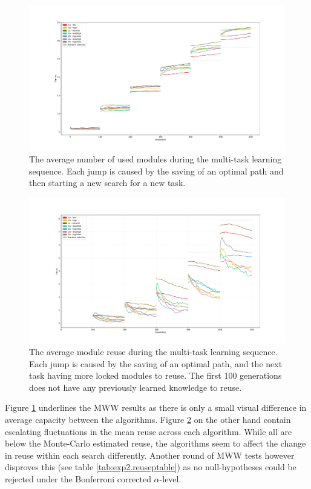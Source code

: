 \begin{figure}
    \includegraphics[width=1.2\textwidth,center]{Chapters/4.Experiments/exp2/figures/large/Capacity_pr_generation.pdf}
    \caption[Capacity plot]{The average number of used modules during the multi-task learning sequence. Each jump is caused by the saving of an optimal path and then starting a new search for a new task. }
    \label{fig:search.capacity}
\end{figure}

\begin{figure}
    \includegraphics[width=1.2\textwidth,center]{Chapters/4.Experiments/exp2/figures/large/Module_reuse_pr_generation.pdf}
    \caption[Module reuse plot]{The average module reuse during the multi-task learning sequence. Each jump is caused by the saving of an optimal path, and the next task having more locked modules to reuse. The first 100 generations does not have any previously learned knowledge to reuse.}
    \label{fig:search.reuse}
\end{figure}

Figure \ref{fig:search.capacity} underlines the MWW results as there is only a small visual difference in average capacity between the algorithms.  Figure \ref{fig:search.reuse} on the other hand contain escalating fluctuations in the mean reuse across each algorithm. While all are below the Monte-Carlo estimated reuse, the algorithms seem to affect the change in reuse within each search differently. Another round of MWW tests however disproves this (see table \ref{tab:exp2.reuseptable}) as no null-hypotheses could be rejected under the Bonferroni corrected \(\alpha\)-level.

